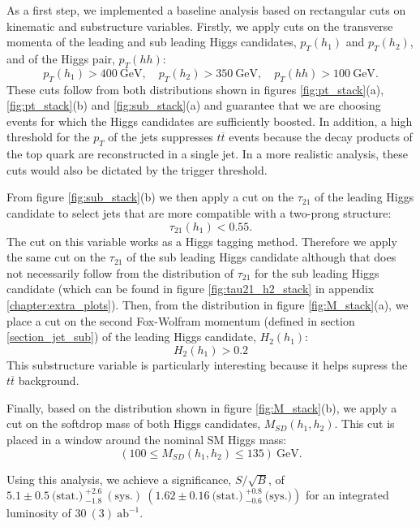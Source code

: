 As a first step, we implemented a baseline analysis based on rectangular cuts on kinematic and substructure variables. Firstly, we apply cuts on the transverse momenta of the leading and sub leading Higgs candidates, $p_T(h_1)$ and $p_T(h_2)$, and of the Higgs pair, $p_T(hh)$:
\begin{equation}
	p_T(h_1)>400 ~\text{GeV}, \quad p_T(h_2)>350 ~\text{GeV}, \quad p_T(hh)>100 ~\text{GeV}.
\end{equation}
These cuts follow from both distributions shown in figures \ref{fig:pt_stack}(a), \ref{fig:pt_stack}(b) and \ref{fig:sub_stack}(a) and guarantee that we are choosing events for which the Higgs candidates are sufficiently boosted. In addition, a high threshold for the $p_T$ of the jets suppresses $t\overline{t}$ events because the decay products of the top quark are reconstructed in a single jet. In a more realistic analysis, these cuts would also be dictated by the trigger threshold. 

From figure \ref{fig:sub_stack}(b) we then apply a cut on the $\tau_{21}$ of the leading Higgs candidate to select jets that are more compatible with a two-prong structure:
\begin{equation}
	\tau_{21}(h_1)<0.55.
\end{equation}
The cut on this variable works as a Higgs tagging method. Therefore we apply the same cut on the $\tau_{21}$ of the sub leading Higgs candidate although that does not necessarily follow from the distribution of $\tau_{21}$ for the sub leading Higgs candidate (which can be found in figure \ref{fig:tau21_h2_stack} in appendix \ref{chapter:extra_plots}).
Then, from the distribution in figure \ref{fig:M_stack}(a), we place a cut on the second Fox-Wolfram momentum (defined in section \ref{section_jet_sub}) of the leading Higgs candidate, $H_2 (h_1)$:
\begin{equation}
	H_2 (h_1)>0.2
\end{equation}
This substructure variable is particularly interesting because it helps supress the $t\overline{t}$ background.

Finally, based on the distribution shown in figure \ref{fig:M_stack}(b), we apply a cut on the softdrop mass of both Higgs candidates, $M_{SD}(h_1,h_2)$. This cut is placed in a window around the nominal SM Higgs mass:
\begin{equation}
	(100\leq M_{SD}(h_1,h_2)\leq 135) ~\text{GeV}.
\end{equation}

Using this analysis, we achieve a significance, $S/\sqrt{B}$, of $5.1\pm0.5~\text{(stat.)}~ ^{+2.6}_{-1.8}~(\text{sys.})~(1.62\pm 0.16~\text{(stat.)}~^{+0.8}_{-0.6}~\text{(sys.)})$ for an integrated luminosity of $30~(3)~\text{ab}^{-1}$.

